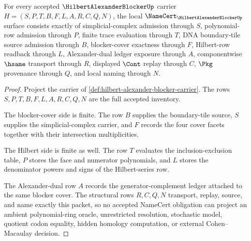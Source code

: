 \begin{theorem}
\label{thm:hilbert-alexander-blocker-namecert-obligations}
For every accepted $\HilbertAlexanderBlockerUp$ carrier $H=(S,P,T,B,F,L,A,R,C,Q,N)$, the local $\NameCert_{\HilbertAlexanderBlockerUp}$ surface consists exactly of simplicial-complex admission through $S$, polynomial-row admission through $P$, finite trace evaluation through $T$, DNA boundary-tile source admission through $B$, blocker-cover exactness through $F$, Hilbert-row readback through $L$, Alexander-dual ledger exposure through $A$, componentwise $\hsame$ transport through $R$, displayed $\Cont$ replay through $C$, $\Pkg$ provenance through $Q$, and local naming through $N$.
\end{theorem}
\begin{proof}
Project the carrier of \autoref{def:hilbert-alexander-blocker-carrier}. The rows $S,P,T,B,F,L,A,R,C,Q,N$ are the full accepted inventory.

The blocker-cover side is finite. The row $B$ supplies the boundary-tile source, $S$ supplies the simplicial-complex carrier, and $F$ records the four cover facets together with their intersection multiplicities.

The Hilbert side is finite as well. The row $T$ evaluates the inclusion-exclusion table, $P$ stores the face and numerator polynomials, and $L$ stores the denominator powers and signs of the Hilbert-series row.

The Alexander-dual row $A$ records the generator-complement ledger attached to the same blocker cover. The structural rows $R,C,Q,N$ transport, replay, source, and name exactly this packet, so no accepted NameCert obligation can project an ambient polynomial-ring oracle, unrestricted resolution, stochastic model, quotient codon equality, hidden homology computation, or external Cohen--Macaulay decision.
\end{proof}

